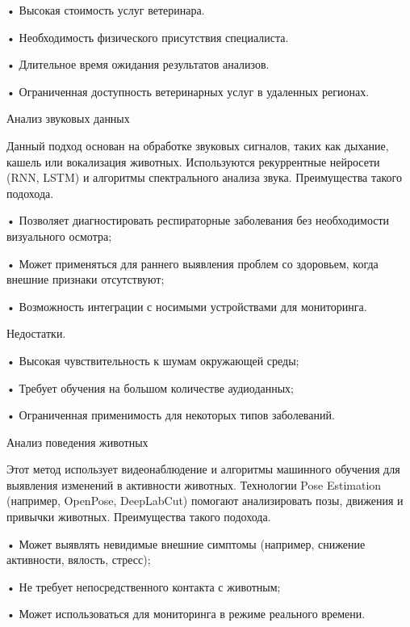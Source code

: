 {  \par \redline • Высокая стоимость услуг ветеринара.
  \par \redline • Необходимость физического присутствия специалиста.
  \par \redline • Длительное время ожидания результатов анализов.
  \par \redline • Ограниченная доступность ветеринарных услуг в удаленных регионах.


  \par \redline Анализ звуковых данных

  \par \redline Данный подход основан на обработке звуковых сигналов, таких как дыхание, кашель или вокализация животных. Используются рекуррентные нейросети (RNN, LSTM) и алгоритмы спектрального анализа звука. Преимущества такого подохода.
  
  \par \redline • Позволяет диагностировать респираторные заболевания без необходимости визуального осмотра;
  \par \redline • Может применяться для раннего выявления проблем со здоровьем, когда внешние признаки отсутствуют;
  \par \redline • Возможность интеграции с носимыми устройствами для мониторинга.

  \par \redline Недостатки.
  
  \par \redline • Высокая чувствительность к шумам окружающей среды;
  \par \redline • Требует обучения на большом количестве аудиоданных;
  \par \redline • Ограниченная применимость для некоторых типов заболеваний.


  \par \redline Анализ поведения животных

  \par \redline Этот метод использует видеонаблюдение и алгоритмы машинного обучения для выявления изменений в активности животных. Технологии Pose Estimation (например, OpenPose, DeepLabCut) помогают анализировать позы, движения и привычки животных. Преимущества такого подохода.
  
  \par \redline • Может выявлять невидимые внешние симптомы (например, снижение активности, вялость, стресс);
  \par \redline • Не требует непосредственного контакта с животным;
  \par \redline • Может использоваться для мониторинга в режиме реального времени.

}
